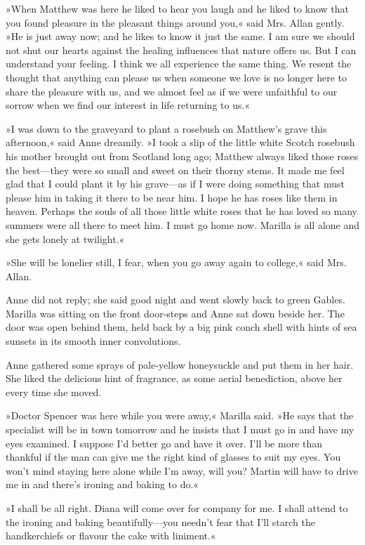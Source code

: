 »When Matthew was here he liked to hear you laugh and he liked to know that you found pleasure in the pleasant things around you,« said Mrs. Allan gently. »He is just away now; and he likes to know it just the same. I am sure we should not shut our hearts against the healing influences that nature offers us. But I can understand your feeling. I think we all experience the same thing. We resent the thought that anything can please us when someone we love is no longer here to share the pleasure with us, and we almost feel as if we were unfaithful to our sorrow when we find our interest in life returning to us.«

»I was down to the graveyard to plant a rosebush on Matthew’s grave this afternoon,« said Anne dreamily. »I took a slip of the little white Scotch rosebush his mother brought out from Scotland long ago; Matthew always liked those roses the best—they were so small and sweet on their thorny stems. It made me feel glad that I could plant it by his grave—as if I were doing something that must please him in taking it there to be near him. I hope he has roses like them in heaven. Perhaps the souls of all those little white roses that he has loved so many summers were all there to meet him. I must go home now. Marilla is all alone and she gets lonely at twilight.«

»She will be lonelier still, I fear, when you go away again to college,« said Mrs. Allan.

Anne did not reply; she said good night and went slowly back to green Gables. Marilla was sitting on the front door-steps and Anne sat down beside her. The door was open behind them, held back by a big pink conch shell with hints of sea sunsets in its smooth inner convolutions.

Anne gathered some sprays of pale-yellow honeysuckle and put them in her hair. She liked the delicious hint of fragrance, as some aerial benediction, above her every time she moved.

»Doctor Spencer was here while you were away,« Marilla said. »He says that the specialist will be in town tomorrow and he insists that I must go in and have my eyes examined. I suppose I’d better go and have it over. I’ll be more than thankful if the man can give me the right kind of glasses to suit my eyes. You won’t mind staying here alone while I’m away, will you? Martin will have to drive me in and there’s ironing and baking to do.«

»I shall be all right. Diana will come over for company for me. I shall attend to the ironing and baking beautifully—you needn’t fear that I’ll starch the handkerchiefs or flavour the cake with liniment.«

